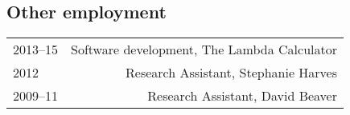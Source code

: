 \documentclass[12pt]{article}
\begin{document}
\subsection*{Other employment}
\begin{longtable}{LR}
  2013--15   & Software development, The Lambda Calculator
               \\
  2012       & Research Assistant, Stephanie Harves\\
  2009--11   & Research Assistant, David Beaver
\end{longtable}


\end{document}
